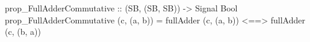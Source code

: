 \begin{haskellcode}
    prop_FullAdderCommutative :: (SB, (SB, SB)) -> Signal Bool
    prop_FullAdderCommutative (c, (a, b)) =
        fullAdder (c, (a, b)) <==> fullAdder (c, (b, a))
\end{haskellcode}
